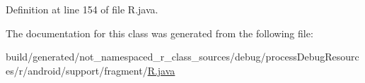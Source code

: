 Definition at line 154 of file R.\+java.



The documentation for this class was generated from the following file\+:\begin{DoxyCompactItemize}
\item 
build/generated/not\+\_\+namespaced\+\_\+r\+\_\+class\+\_\+sources/debug/process\+Debug\+Resources/r/android/support/fragment/\mbox{\hyperlink{android_2support_2fragment_2_r_8java}{R.\+java}}\end{DoxyCompactItemize}
